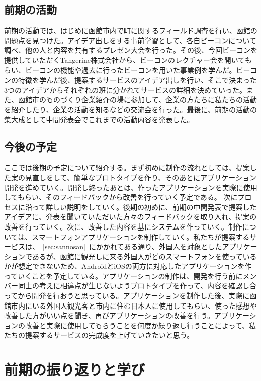 \documentclass[11pt,papersize]{jsbook}
\begin{document}
\section{前期の活動}
  前期の活動では、はじめに函館市内で町に関するフィールド調査を行い、函館の問題点を見つけた。アイデア出しをする事前学習として、各自ビーコンについて調べ、他の人と内容を共有するプレゼン大会を行った。その後、今回ビーコンを提供していただくTangerine株式会社から、ビーコンのレクチャー会を開いてもらい、ビーコンの機能や過去に行ったビーコンを用いた事業例を学んだ。ビーコンの特徴を学んだ後、提案するサービスのアイデア出しを行い、そこで決まった3つのアイデアからそれぞれの班に分かれてサービスの詳細を決めていった。また、函館市のものづくり企業紹介の場に参加して、企業の方たちに私たちの活動を紹介したり、企業の活動を知るなどの交流会を行った。最後に、前期の活動の集大成として中間発表会でこれまでの活動内容を発表した。

\section{今後の予定}
 ここでは後期の予定について紹介する。まず初めに制作の流れとしては、提案した案の見直しをして、簡単なプロトタイプを作り、そのあとにアプリケーション開発を進めていく。開発し終ったあとは、作ったアプリケーションを実際に使用してもらい、そのフィードバックから改善を行っていく予定である。
次にプロセスに沿って詳しい説明をしていく。後期の初めに、前期の中間発表で提案したアイデアに、発表を聞いていただいた方々のフィードバックを取り入れ、提案の改善を行っていく。次に、改善した内容を基にシステムを作っていく。制作については、スマートフォンアプリケーションを制作していく。私たちが提案するサービスは、~\ref{sec:sannosan}~にかかれてある通り、外国人を対象としたアプリケーションであるが、函館に観光しに来る外国人がどのスマートフォンを使っているかが想定できないため、AndroidとiOSの両方に対応したアプリケーションを作っていくことを予定している。アプリケーションの制作は、開発を行う前にメンバー同士の考えに相違点が生じないようプロトタイプを作って、内容を確認し合ってから開発を行おうと思っている。アプリケーションを制作した後、実際に函館市内にいる外国人観光客と市内に住む日本人に使用してもらい、使った感想や改善した方がいい点を聞き、再びアプリケーションの改善を行う。アプリケーションの改善と実際に使用してもらうことを何度か繰り返し行うことによって、私たちの提案するサービスの完成度を上げていきたいと思う。


\chapter{前期の振り返りと学び}
\end{document}
